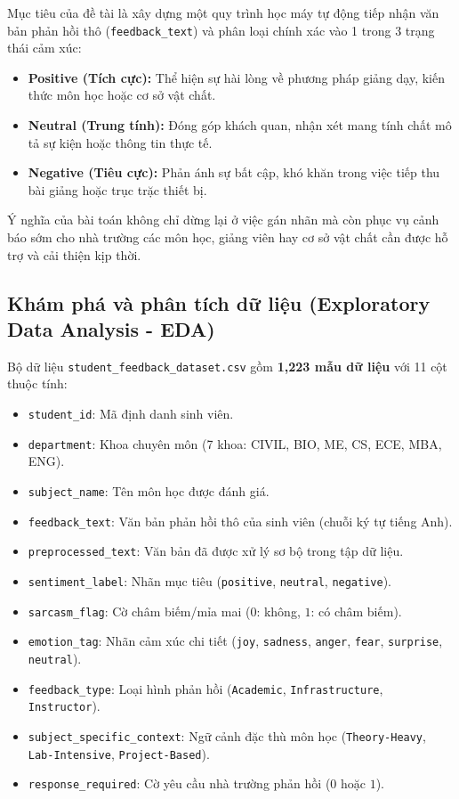 \documentclass[12pt,a4paper]{article}
\begin{document}
Mục tiêu của đề tài là xây dựng một quy trình học máy tự động tiếp nhận văn bản phản hồi thô (\texttt{feedback\_text}) và phân loại chính xác vào 1 trong 3 trạng thái cảm xúc:
\begin{itemize}
    \item \textbf{Positive (Tích cực):} Thể hiện sự hài lòng về phương pháp giảng dạy, kiến thức môn học hoặc cơ sở vật chất.
    \item \textbf{Neutral (Trung tính):} Đóng góp khách quan, nhận xét mang tính chất mô tả sự kiện hoặc thông tin thực tế.
    \item \textbf{Negative (Tiêu cực):} Phản ánh sự bất cập, khó khăn trong việc tiếp thu bài giảng hoặc trục trặc thiết bị.
\end{itemize}

Ý nghĩa của bài toán không chỉ dừng lại ở việc gán nhãn mà còn phục vụ cảnh báo sớm cho nhà trường các môn học, giảng viên hay cơ sở vật chất cần được hỗ trợ và cải thiện kịp thời.

\subsection{Khám phá và phân tích dữ liệu (Exploratory Data Analysis - EDA)}
Bộ dữ liệu \texttt{student\_feedback\_dataset.csv} gồm \textbf{1,223 mẫu dữ liệu} với 11 cột thuộc tính:
\begin{itemize}
    \item \texttt{student\_id}: Mã định danh sinh viên.
    \item \texttt{department}: Khoa chuyên môn (7 khoa: CIVIL, BIO, ME, CS, ECE, MBA, ENG).
    \item \texttt{subject\_name}: Tên môn học được đánh giá.
    \item \texttt{feedback\_text}: Văn bản phản hồi thô của sinh viên (chuỗi ký tự tiếng Anh).
    \item \texttt{preprocessed\_text}: Văn bản đã được xử lý sơ bộ trong tập dữ liệu.
    \item \texttt{sentiment\_label}: Nhãn mục tiêu (\texttt{positive}, \texttt{neutral}, \texttt{negative}).
    \item \texttt{sarcasm\_flag}: Cờ châm biếm/mỉa mai ($0$: không, $1$: có châm biếm).
    \item \texttt{emotion\_tag}: Nhãn cảm xúc chi tiết (\texttt{joy}, \texttt{sadness}, \texttt{anger}, \texttt{fear}, \texttt{surprise}, \texttt{neutral}).
    \item \texttt{feedback\_type}: Loại hình phản hồi (\texttt{Academic}, \texttt{Infrastructure}, \texttt{Instructor}).
    \item \texttt{subject\_specific\_context}: Ngữ cảnh đặc thù môn học (\texttt{Theory-Heavy}, \texttt{Lab-Intensive}, \texttt{Project-Based}).
    \item \texttt{response\_required}: Cờ yêu cầu nhà trường phản hồi ($0$ hoặc $1$).
\end{itemize}
\end{document}
